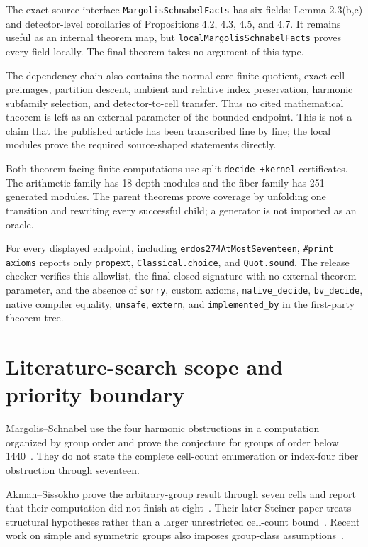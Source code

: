 \documentclass[11pt]{article}
\theoremstyle{definition}
\newcommand{\leanname}[1]{\nolinkurl{#1}}
\begin{document}
The exact source interface \leanname{MargolisSchnabelFacts} has six fields:
Lemma 2.3(b,c) and detector-level corollaries of Propositions 4.2, 4.3, 4.5,
and 4.7. It remains useful as an internal theorem map, but
\leanname{localMargolisSchnabelFacts} proves every field locally. The final
theorem takes no argument of this type.

The dependency chain also contains the normal-core finite quotient, exact cell
preimages, partition descent, ambient and relative index preservation,
harmonic subfamily selection, and detector-to-cell transfer. Thus no cited
mathematical theorem is left as an external parameter of the bounded endpoint.
This is not a claim that the published article has been transcribed line by
line; the local modules prove the required source-shaped statements directly.

Both theorem-facing finite computations use split \texttt{decide +kernel}
certificates. The arithmetic family has 18 depth modules and the fiber family
has 251 generated modules. The parent theorems prove coverage by unfolding one
transition and rewriting every successful child; a generator is not imported
as an oracle.

For every displayed endpoint, including
\leanname{erdos274AtMostSeventeen}, \texttt{\#print axioms} reports only
\leanname{propext}, \leanname{Classical.choice}, and
\leanname{Quot.sound}. The release checker verifies this allowlist, the final
closed signature with no external theorem parameter, and the absence of
\texttt{sorry}, custom axioms,
\texttt{native\_decide}, \texttt{bv\_decide}, native compiler equality,
\texttt{unsafe}, \texttt{extern}, and \texttt{implemented\_by} in the
first-party theorem tree.

\section{Literature-search scope and priority boundary}
\label{sec:literature-boundary}

Margolis--Schnabel use the four harmonic obstructions in a computation
organized by group order and prove the conjecture for groups of order below
1440~\cite{MS19}. They do not state the complete cell-count enumeration or
index-four fiber obstruction through seventeen.

Akman--Sissokho prove the arbitrary-group result through seven cells and
report that their computation did not finish at eight~\cite{AS25}. Their
later Steiner paper treats structural hypotheses rather than a larger
unrestricted cell-count bound~\cite{ASSteiner,ASSteinerErratum}. Recent work
on simple and symmetric groups also imposes group-class
assumptions~\cite{GM25}.
\end{document}
